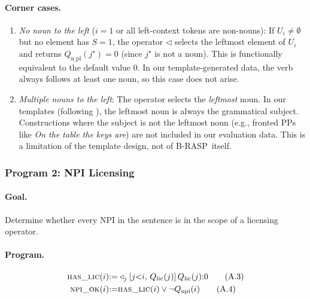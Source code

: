 \documentclass[11pt]{article}
\begin{document}
\paragraph{Corner cases.}
\begin{enumerate}[itemsep=2pt,leftmargin=*]
    \item \textit{No noun to the left} ($i = 1$ or all left-context tokens are non-nouns): If $U_i \neq \emptyset$ but no element has $S = 1$, the operator $\triangleleft$ selects the leftmost element of $U_i$ and returns $Q_\text{n\_pl}(j^\star) = 0$ (since $j^\star$ is not a noun). This is functionally equivalent to the default value 0. In our template-generated data, the verb always follows at least one noun, so this case does not arise.
    \item \textit{Multiple nouns to the left}: The operator selects the \emph{leftmost} noun. In our templates (following \citealp{marvin2018targeted}), the leftmost noun is always the grammatical subject. Constructions where the subject is not the leftmost noun (e.g., fronted PPs like \textit{On the table the keys are}) are not included in our evaluation data. This is a limitation of the template design, not of B-RASP~itself.
\end{enumerate}

\subsubsection{Program 2: NPI Licensing}
\label{app:prog-npi}

\paragraph{Goal.} Determine whether every NPI in the sentence is in the scope of a licensing operator.

\paragraph{Program.}
\begin{align}
\textsc{has\_lic}(i) &{:=} \triangleleft_j[j{<}i,\, Q_\text{lic}(j)]\, Q_\text{lic}(j) {:} 0 \tag{A.3} \\
\textsc{npi\_ok}(i) &{:=} \textsc{has\_lic}(i) \lor \neg Q_\text{npi}(i) \tag{A.4}
\end{align}
\end{document}
